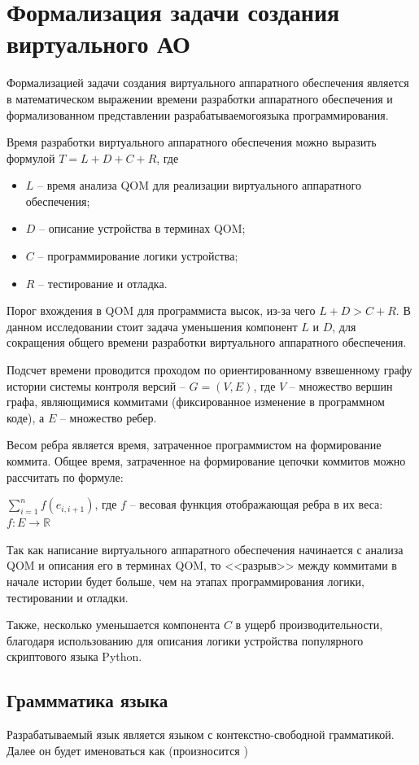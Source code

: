 \section{Формализация задачи создания виртуального АО}\label{sec:ch2/sec2/sub1}

Формализацией задачи создания виртуального аппаратного
обеспечения является в математическом выражении времени разработки
аппаратного обеспечения и формализованном представлении разрабатываемогоязыка программирования.

Время разработки виртуального аппаратного обеспечения
можно выразить формулой $T = L + D + C + R$, где
\begin{itemize}
    \item $L$ -- время анализа QOM для реализации виртуального аппаратного обеспечения;
    \item $D$ -- описание устройства в терминах QOM;
    \item $C$ -- программирование логики устройства;
    \item $R$ -- тестирование и отладка.
\end{itemize}

Порог вхождения в QOM для программиста высок, из-за чего
$L + D > C + R$.
В данном исследовании стоит задача уменьшения компонент $L$ и $D$,
для сокращения общего времени разработки виртуального аппаратного
обеспечения.

Подсчет времени проводится проходом по
ориентированному взвешенному графу истории системы контроля
версий -- $G = (V,E)$, где $V$ -- множество вершин графа,
являющимися коммитами (фиксированное изменение в программном коде),
а $E$ -- множество ребер.

Весом ребра является время, затраченное программистом на
формирование коммита. Общее время, затраченное на
формирование цепочки коммитов можно рассчитать по
формуле:

$\sum_{i=1}^{n} f(e_{i,i+1})$, где $f$ -- весовая функция
отображающая ребра в их веса: $f : E \rightarrow \mathbb{R}$

Так как написание виртуального аппаратного обеспечения
начинается с анализа QOM и описания его в терминах QOM,
то <<разрыв>> между коммитами в начале истории будет больше, чем
на этапах программирования логики, тестировании и отладки.

Также, несколько уменьшается компонента $C$ в ущерб производительности,
благодаря использованию для описания логики устройства
популярного скриптового языка Python.

\subsection{Граммматика языка}\label{sec:ch2/sec2/sub2}
Разрабатываемый язык является языком с контекстно-свободной грамматикой.
Далее он будет именоваться как {\mylanguage} (произносится \mylanguageprononciation)

